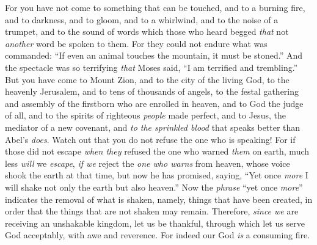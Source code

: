 \begin{biblechapter}
\verse For you have not come to something that can be touched, and to a burning fire, and to darkness, and to gloom, and to a whirlwind,
\verse and to the noise of a trumpet, and to the sound of words which those who heard begged \textit{that} not \textit{another} word be spoken to them.
\verse For they could not endure what was commanded: “If even an animal touches the mountain, it must be stoned.”
\verse And the spectacle was so terrifying \textit{that} Moses said, “I am terrified and trembling.”
\verse But you have come to Mount Zion, and to the city of the living God, to the heavenly Jerusalem, and to tens of thousands of angels, to the festal gathering
\verse and assembly of the firstborn who are enrolled in heaven, and to God the judge of all, and to the spirits of righteous \textit{people} made perfect,
\verse and to Jesus, the mediator of a new covenant, and \textit{to the sprinkled blood} that speaks better than Abel’s \textit{does}.
\verse Watch out that you do not refuse the one who is speaking! For if those did not escape \textit{when they} refused the one who warned \textit{them} on earth, much less \textit{will} we \textit{escape}, \textit{if we} reject the \textit{one who warns} from heaven,
\verse whose voice shook the earth at that time, but now he has promised, saying, “Yet once \textit{more} I will shake not only the earth but also heaven.”
\verse Now the \textit{phrase} “yet once \textit{more}” indicates the removal of what is shaken, namely, things that have been created, in order that the things that are not shaken may remain.
\verse Therefore, \textit{since we} are receiving an unshakable kingdom, let us be thankful, through which let us serve God acceptably, with awe and reverence.
\verse For indeed our God \textit{is} a consuming fire.
\end{biblechapter}

